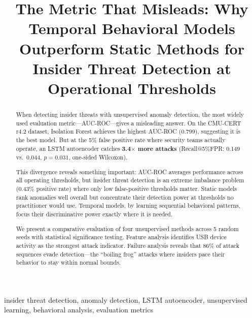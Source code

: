 \documentclass[conference]{IEEEtran}
\begin{document}
\title{The Metric That Misleads: Why Temporal Behavioral Models Outperform Static Methods for Insider Threat Detection at Operational Thresholds}

\author{
}

\maketitle

\begin{abstract}
When detecting insider threats with unsupervised anomaly detection, the most widely used evaluation metric---AUC-ROC---gives a misleading answer. On the CMU-CERT r4.2 dataset, Isolation Forest achieves the highest AUC-ROC (0.799), suggesting it is the best model. But at the 5\% false positive rate where security teams actually operate, an LSTM autoencoder catches \textbf{3.4$\times$ more attacks} (Recall@5\%FPR: 0.149 vs.\ 0.044, $p = 0.031$, one-sided Wilcoxon).

This divergence reveals something important: AUC-ROC averages performance across all operating thresholds, but insider threat detection is an extreme imbalance problem (0.43\% positive rate) where only low false-positive thresholds matter. Static models rank anomalies well overall but concentrate their detection power at thresholds no practitioner would use. Temporal models, by learning sequential behavioral patterns, focus their discriminative power exactly where it is needed.

We present a comparative evaluation of four unsupervised methods across 5 random seeds with statistical significance testing. Feature analysis identifies USB device activity as the strongest attack indicator. Failure analysis reveals that 86\% of attack sequences evade detection---the ``boiling frog'' attacks where insiders pace their behavior to stay within normal bounds.
\end{abstract}

\begin{IEEEkeywords}
insider threat detection, anomaly detection, LSTM autoencoder, unsupervised learning, behavioral analysis, evaluation metrics
\end{IEEEkeywords}

\end{document}
